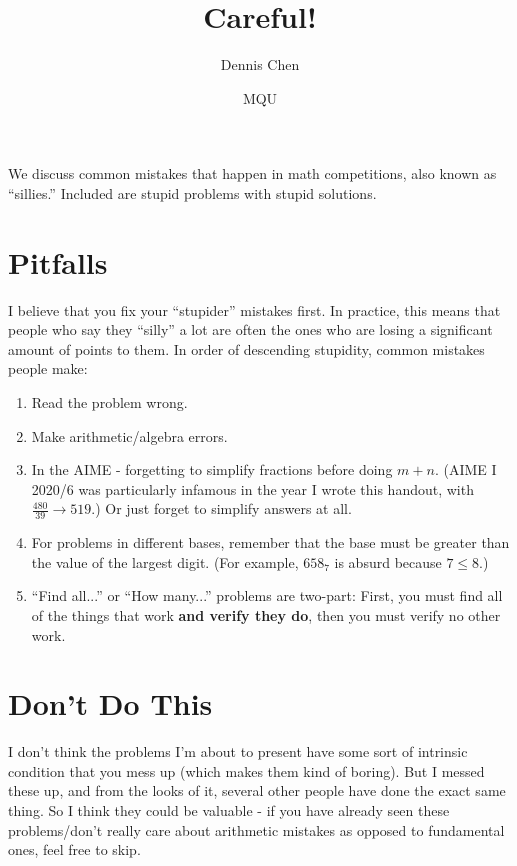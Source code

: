 \documentclass[mast]{lucky}
\title{Careful!}
\author{Dennis Chen}
\date{MQU}
\begin{document}
\maketitle
We discuss common mistakes that happen in math competitions, also known as ``sillies.'' Included are stupid problems with stupid solutions.

\section{Pitfalls}
I believe that you fix your ``stupider'' mistakes first. In practice, this means that people who say they ``silly'' a lot are often the ones who are losing a significant amount of points to them. In order of descending stupidity, common mistakes people make:

\begin{enumerate}
    \item Read the problem wrong.

    \item Make arithmetic/algebra errors.
    
    \item In the AIME - forgetting to simplify fractions before doing $m+n.$ (AIME I 2020/6 was particularly infamous in the year I wrote this handout, with $\frac{480}{39}\to 519.$) Or just forget to simplify answers at all.
    
    \item For problems in different bases, remember that the base must be greater than the value of the largest digit. (For example, $658_7$ is absurd because $7\leq 8.$)
    
    \item ``Find all...'' or ``How many...'' problems are two-part: First, you must find all of the things that work \textbf{and verify they do}, then you must verify no other work.
    
\end{enumerate}

\section{Don't Do This}
I don't think the problems I'm about to present have some sort of intrinsic condition that you mess up (which makes them kind of boring). But I messed these up, and from the looks of it, several other people have done the exact same thing. So I think they could be valuable - if you have already seen these problems/don't really care about arithmetic mistakes as opposed to fundamental ones, feel free to skip.
\end{document}
